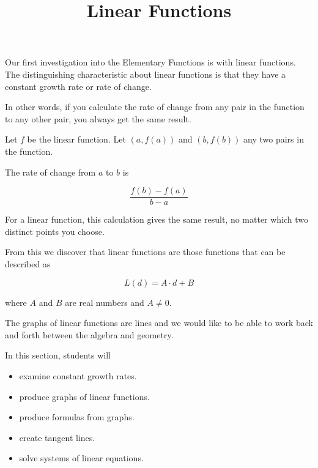 \documentclass{ximera}
\title{Linear Functions}
\begin{document}
\begin{abstract}
\end{abstract}
\maketitle









Our first investigation into the Elementary Functions is with linear functions. The distinguishing characteristic about linear functions is that they have a constant growth rate or rate of change.  


In other words, if you calculate the rate of change from any pair in the function to any other pair, you always get the same result.

Let $f$ be the linear function.  Let $(a, f(a))$ and $(b, f(b))$ any two pairs in the function.

The rate of change from $a$ to $b$ is 

\[
\frac{f(b) - f(a)}{b-a}
\]


For a linear function, this calculation gives the same result, no matter which two distinct points you choose.













From this we discover that linear functions are those functions that can be described as

\[  L(d) = A \cdot d + B \]

where $A$ and $B$ are real numbers and $A \ne 0$.


The graphs of linear functions are lines and we would like to be able to work back and forth between the algebra and geometry.




















\begin{sectionOutcomes}
In this section, students will 

\begin{itemize}
\item examine constant growth rates.
\item produce graphs of linear functions.
\item produce formulas from graphs.
\item create tangent lines.
\item solve systems of linear equations.
\end{itemize}
\end{sectionOutcomes}
\end{document}
